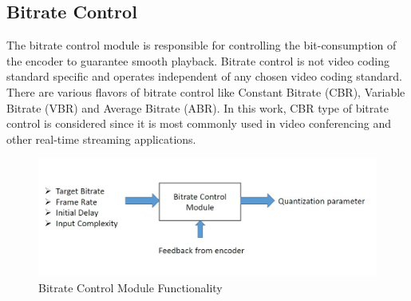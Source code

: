\documentclass[11pt]{article} %
\begin{document}
\subsection{Bitrate Control} \label{Intro:Bitrate-Control}
	The bitrate control module is responsible for controlling the bit-consumption of the encoder to guarantee smooth playback. Bitrate control is not video coding standard specific and operates independent of any chosen video coding standard. There are various flavors of bitrate control like Constant Bitrate (CBR), Variable Bitrate (VBR) and Average Bitrate (ABR). In this work, CBR type of bitrate control is considered since it is most commonly used in video conferencing and other real-time streaming applications. 
\begin{figure}[h]
    \centering
    \includegraphics[scale=0.5]{RC_block}
    \caption{Bitrate Control Module Functionality}
    \label{fig:Bitrate Control Module Functionality}
\end{figure} 
\end{document}
